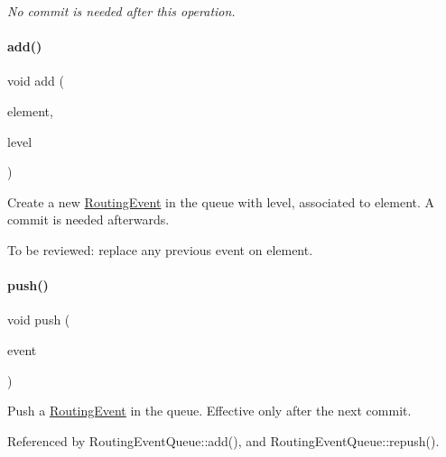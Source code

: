{\itshape No commit is needed after this operation.} \mbox{\label{classKite_1_1RoutingEventQueue_af0813b67c9fc72d960f7e512e9403d57}} 
\paragraph{\texorpdfstring{add()}{add()}}
{\footnotesize\ttfamily void add (\begin{DoxyParamCaption}\item[{\hyperlink{classKite_1_1TrackElement}{Track\+Element} $\ast$}]{element,  }\item[{unsigned int}]{level }\end{DoxyParamCaption})}

Create a new \hyperlink{classKite_1_1RoutingEvent}{Routing\+Event} in the queue with {\ttfamily level}, associated to {\ttfamily element}. A commit is needed afterwards.

To be reviewed\+: replace any previous event on element. \mbox{\label{classKite_1_1RoutingEventQueue_ac802427673567526d06af911e94f7216}} 
\paragraph{\texorpdfstring{push()}{push()}}
{\footnotesize\ttfamily void push (\begin{DoxyParamCaption}\item[{\hyperlink{classKite_1_1RoutingEvent}{Routing\+Event} $\ast$}]{event }\end{DoxyParamCaption})\hspace{0.3cm}{\ttfamily [inline]}}

Push a \hyperlink{classKite_1_1RoutingEvent}{Routing\+Event} in the queue. Effective only after the next commit. 

Referenced by Routing\+Event\+Queue\+::add(), and Routing\+Event\+Queue\+::repush().

\mbox{\label{classKite_1_1RoutingEventQueue_afd2fa6d6f5d90c472bea9befa97d955d}} 
